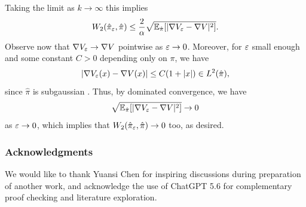 \documentclass[11pt,a4paper]{article}
\begin{document}
    Taking the limit as $k \to \infty$ this implies
    \begin{align*}
        W_2(\hat \pi_\eps, \hat \pi) \leq \frac{2}{\alpha}\sqrt{\expewr{\hat \pi}{\abs{\nabla V_{\eps}  - \nabla V}^{2}}}.
    \end{align*}
    Observe now that $\nabla V_\eps \to \nabla V$ pointwise as $\eps\to 0$. Moreover, for $\eps$ small enough and some constant $C>0$ depending only on $\pi$, we have
    \[
        \abs*{\nabla V_\eps (x)-\nabla V(x)} \le C(1+\abs{x}) \in L^2(\hat \pi),
    \]
    since $\hat \pi$ is subgaussian \cite{vempala2023rapid}. Thus, by dominated convergence, we have 
    \[
        \sqrt{\expewr{\hat \pi}{\abs{\nabla V_{\eps}  - \nabla V}^{2}}} \to 0
    \]
    as $\eps \to 0$, which implies that $W_2(\hat \pi_\eps, \hat \pi) \to 0$ too, as desired.
    
    
    \subsubsection*{Acknowledgments}
    We would like to thank Yuansi Chen for inspiring discussions during preparation of another work, and acknowledge the use of ChatGPT 5.6 for complementary proof checking and literature exploration.
    
    \printbibliography 

    \appendix

    
    
\end{document}
